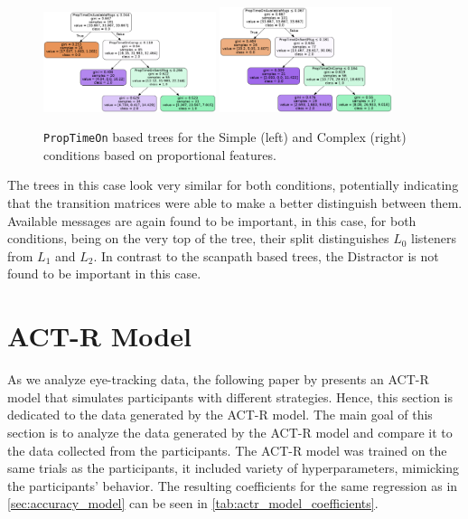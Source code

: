 \begin{figure}
    \centering
    \includegraphics[width=0.45\textwidth]{images/tree_classifier_prop_simple.png}
    \includegraphics[width=0.45\textwidth]{images/tree_classifier_prop_complex.png}
    \caption{\texttt{PropTimeOn} based trees for the Simple (left) and Complex (right) conditions based on proportional features.}
    \label{fig:scanp_trees_prop}
\end{figure}

The trees in this case look very similar for both conditions, potentially indicating that the transition matrices were able to make a better distinguish between them. Available messages are again found to be important, in this case, for both conditions, being on the very top of the tree, their split distinguishes $L_0$ listeners from $L_1$ and $L_2$. In contrast to the scanpath based trees, the Distractor is not found to be important in this case. 




\section{ACT-R Model}
\label{sec:actr_model}
As we analyze eye-tracking data, the following paper by  presents an ACT-R model that simulates participants with different strategies. Hence, this section is dedicated to the data generated by the ACT-R model. The main goal of this section is to analyze the data generated by the ACT-R model and compare it to the data collected from the participants. The ACT-R model was trained on the same trials as the participants, it included variety of hyperparameters, mimicking the participants' behavior. The resulting coefficients for the same regression as in \autoref{sec:accuracy_model} can be seen in \autoref{tab:actr_model_coefficients}. 

